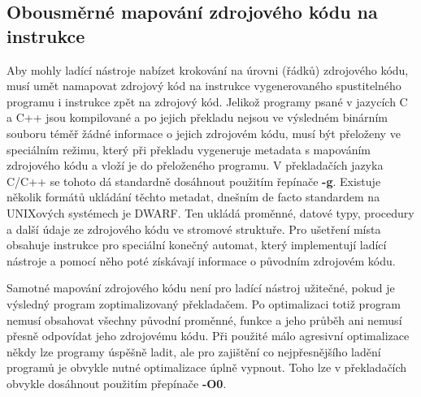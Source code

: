 \documentclass[bc,male,java,dept460]{diploma}						%
\begin{document}
	\subsection{Obousměrné mapování zdrojového kódu na instrukce}
		Aby mohly ladící nástroje nabízet krokování na úrovni (řádků) zdrojového kódu, musí umět namapovat zdrojový kód na instrukce vygenerovaného
		spustitelného programu i instrukce zpět na zdrojový kód. Jelikož programy psané v jazycích C a C++ jsou kompilované a po jejich překladu nejsou
		ve výsledném binárním souboru téměř žádné informace o jejich zdrojovém kódu, musí být přeloženy ve speciálním režimu, který při překladu vygeneruje
		metadata s mapováním zdrojového kódu a vloží je do přeloženého programu. V překladačích jazyka C/C++ se tohoto dá standardně dosáhnout použitím
		řepínače \textbf{-g}. Existuje několik formátů ukládání těchto metadat, dnešním de facto standardem na UNIXových systémech je DWARF\cite{dwarf}.
		Ten ukládá proměnné, datové typy, procedury a další údaje ze zdrojového kódu ve stromové struktuře. Pro ušetření místa obsahuje instrukce pro
		speciální konečný automat, který implementují ladící nástroje a pomocí něho poté získávají informace o původním zdrojovém kódu.
		
		\vspace{5mm}
		
		\par Samotné mapování zdrojového kódu není pro ladící nástroj užitečné, pokud je výsledný program zoptimalizovaný překladačem. Po optimalizaci
		totiž program nemusí obsahovat všechny původní proměnné, funkce a jeho průběh ani nemusí přesně odpovídat jeho zdrojovému kódu. Při použité málo agresivní
		optimalizace někdy lze programy úspěšně ladit, ale pro zajištění co nejpřesnějšího ladění programů je obvykle nutné optimalizace úplně vypnout. Toho lze
		v překladačích obvykle dosáhnout použitím přepínače \textbf{-O0}.
	
\end{document}
